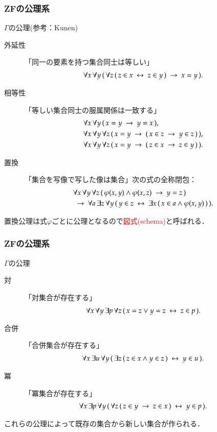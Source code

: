 \documentclass[dvipdfmx,10pt,notheorems]{beamer}
\theoremstyle{definition}
\newcommand{\rarrow}{\hspace{0.25em}\rightarrow\hspace{0.25em}} %
\newcommand{\lrarrow}{\hspace{0.25em}\leftrightarrow\hspace{0.25em}} %
\begin{document}
\begin{frame}\frametitle{{\bf ZF}の公理系}
	\begin{alertblock}{$\Gamma$の公理(参考：Kunen\cite{Kunen})}
		\begin{description}
			\item[外延性] 「同一の要素を持つ集合同士は等しい」
				\begin{align}
					\forall x\, \forall y\, (\, \forall z\, (\, z \in x \lrarrow z \in y\, ) \rarrow x = y\, ).
				\end{align}
			\item[相等性] 「等しい集合同士の服属関係は一致する」
				\begin{align}
					&\forall x\, \forall y\, (\, x = y \rarrow y = x\, ), \\
					&\forall x\, \forall y\, \forall z\, 
					(\, x = y \rarrow (\, x \in z \rarrow y \in z\, )\, ), \\
					&\forall x\, \forall y\, \forall z\, 
					(\, x = y \rarrow (\, z \in x \rarrow z \in y\, )\, ).
				\end{align}
			\item[置換] 「集合を写像で写した像は集合」次の式の全称閉包： 
				\begin{align}
					&\forall x\, \forall y\, \forall z\, 
					(\, \varphi(x,y) \wedge \varphi(x,z) \rarrow y = z\, ) \\
					&\rarrow \forall a\, \exists z\, \forall y\,
					(\, y \in z \lrarrow \exists x\, (\, x \in a \wedge \varphi(x,y)\, )\, ).
				\end{align}
		\end{description}	
	\end{alertblock}
	置換公理は式$\varphi$ごとに公理となるので\textcolor{red}{図式(schema)}と呼ばれる．
\end{frame}

\begin{frame}\frametitle{{\bf ZF}の公理系}
	\begin{alertblock}{$\Gamma$の公理}
		\begin{description}
			\item[対] 「対集合が存在する」
				\begin{align}
					\forall x\, \forall y\, \exists p\, \forall z\, (\, x = z \vee y = z \lrarrow z \in p\, ).
				\end{align}
			\item[合併] 「合併集合が存在する」
				\begin{align}
					\forall x\, \exists u\, \forall y\, (\, \exists z\, (\, z \in x \wedge y \in z\, ) \lrarrow y \in u\, ).
				\end{align}
			\item[冪] 「冪集合が存在する」
				\begin{align}
					\forall x\, \exists p\, \forall y\, (\, \forall z\, (\, z \in y \rarrow z \in x\, ) 
					\lrarrow y \in p\, ).
				\end{align}
		\end{description}
	\end{alertblock}
	これらの公理によって既存の集合から新しい集合が作られる．
\end{frame}
\end{document}

